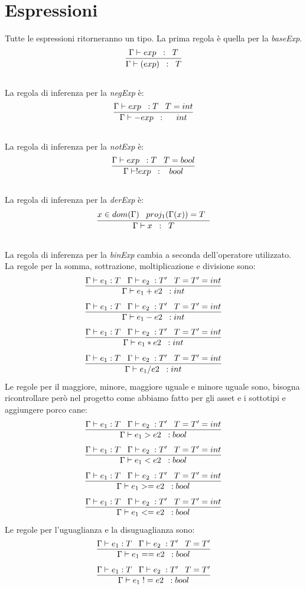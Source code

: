 \documentclass[12pt, a4paper]{report}
\begin{document}
\section{Espressioni}
Tutte le espressioni ritorneranno un tipo. La prima regola è quella per la \emph{baseExp}.\\
\[\infer{\Gamma \vdash (exp) \;\; : \;\; T}{\Gamma \vdash exp \;\;  : \;\; T }\]\\
La regola di inferenza per la \emph{negExp} è:\\
\[\infer{\Gamma \vdash -exp \;\; : \;\;  \;\;\; int}{\Gamma \vdash exp \;\;  : T\;\;\; T=int }\]\\
La regola di inferenza per la \emph{notExp} è:\\
\[\infer{\Gamma \vdash !exp \;\; : \;\;\; bool}{\Gamma \vdash exp \;\;  : T\;\;\;  T=bool }\]\\
La regola di inferenza per la \emph{derExp} è:\\
\[\infer{\Gamma \vdash x \;\; : \;\; T}{x \in dom(\Gamma) \;\;\; proj_1(\Gamma(x)) = T \;\; }\]\\
La regola di inferenza per la \emph{binExp} cambia a seconda dell'operatore utilizzato. La regole per la somma, sottrazione, moltiplicazione e divisione sono:
\[ \infer{\Gamma \vdash e_1 + e2 \;\; : int}{\Gamma \vdash e_1 :T \;\;\; \Gamma \vdash e_2 \; : T' \;\;\; T=T'=int} \]
\[ \infer{\Gamma \vdash e_1 - e2 \;\; : int}{\Gamma \vdash e_1 :T \;\;\; \Gamma \vdash e_2 \; : T' \;\;\; T=T'=int} \]
\[ \infer{\Gamma \vdash e_1 * e2 \;\; : int}{\Gamma \vdash e_1 :T \;\;\; \Gamma \vdash e_2 \; : T' \;\;\; T=T'=int} \]
\[ \infer{\Gamma \vdash e_1 / e2 \;\; : int}{\Gamma \vdash e_1 :T \;\;\; \Gamma \vdash e_2 \; : T' \;\;\; T=T'=int} \]
Le regole per il maggiore, minore, maggiore uguale e minore uguale sono, bisogna ricontrollare però nel progetto come abbiamo fatto per gli asset e i sottotipi e aggiungere porco cane:
\[ \infer{\Gamma \vdash e_1 > e2 \;\; : bool}{\Gamma \vdash e_1 :T \;\;\; \Gamma \vdash e_2 \; : T' \;\;\; T=T'=int} \]
\[ \infer{\Gamma \vdash e_1 < e2 \;\; : bool}{\Gamma \vdash e_1 :T \;\;\; \Gamma \vdash e_2 \; : T' \;\;\; T=T'=int} \]
\[ \infer{\Gamma \vdash e_1 >= e2 \;\; : bool}{\Gamma \vdash e_1 :T \;\;\; \Gamma \vdash e_2 \; : T' \;\;\; T=T'=int} \]
\[ \infer{\Gamma \vdash e_1 <= e2 \;\; : bool}{\Gamma \vdash e_1 :T \;\;\; \Gamma \vdash e_2 \; : T' \;\;\; T=T'=int} \]
Le regole per l'uguaglianza e la disuguaglianza sono:
\[ \infer{\Gamma \vdash e_1 == e2 \;\; : bool}{\Gamma \vdash e_1 :T \;\;\; \Gamma \vdash e_2 \; : T' \;\;\; T=T'} \]
\[ \infer{\Gamma \vdash e_1 \; != e2 \;\; : bool}{\Gamma \vdash e_1 :T \;\;\; \Gamma \vdash e_2 \; : T' \;\;\; T=T'} \]
\end{document}
